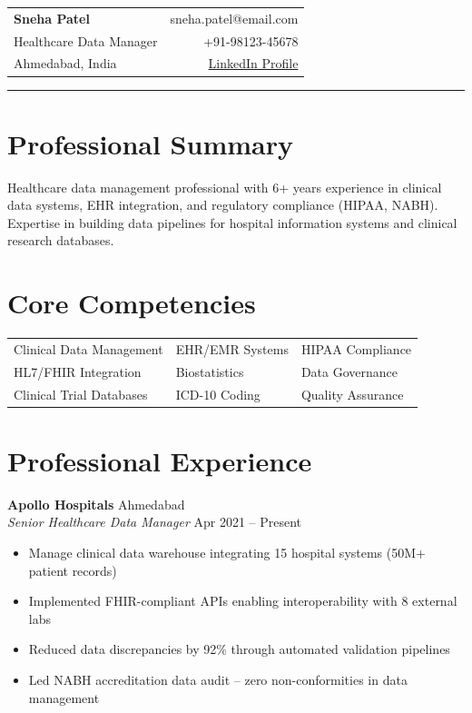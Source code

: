\documentclass[10pt,letterpaper]{article}
\begin{document}
\noindent\begin{tabularx}{\linewidth}{@{}Xr@{}}
{\LARGE\bfseries\color{medblue} Sneha Patel} & {\small sneha.patel@email.com}\\
{\small Healthcare Data Manager} & {\small +91-98123-45678}\\
{\small Ahmedabad, India} & {\small \href{https://linkedin.com/in/snehapatel}{LinkedIn Profile}}\\
\end{tabularx}

\vspace{4pt}
\noindent\rule{\linewidth}{1.5pt}

\section{Professional Summary}
Healthcare data management professional with 6+ years experience in clinical data systems, EHR integration, and regulatory compliance (HIPAA, NABH). Expertise in building data pipelines for hospital information systems and clinical research databases.

\section{Core Competencies}
\begin{tabularx}{\linewidth}{@{}XXX@{}}
\arrayrulecolor{medblue}
Clinical Data Management & EHR/EMR Systems & HIPAA Compliance\\
HL7/FHIR Integration & Biostatistics & Data Governance\\
Clinical Trial Databases & ICD-10 Coding & Quality Assurance\\
\end{tabularx}

\section{Professional Experience}
\textbf{Apollo Hospitals} \hfill Ahmedabad\\
\textit{Senior Healthcare Data Manager} \hfill Apr 2021 -- Present
\begin{itemize}
\item Manage clinical data warehouse integrating 15 hospital systems (50M+ patient records)
\item Implemented FHIR-compliant APIs enabling interoperability with 8 external labs
\item Reduced data discrepancies by 92\% through automated validation pipelines
\item Led NABH accreditation data audit -- zero non-conformities in data management
\end{itemize}
\end{document}
